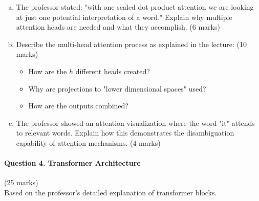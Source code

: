 \documentclass[12pt]{article}
\newcommand{\shortanswer}{\vspace{2cm}}
\newcommand{\mediumanswer}{\vspace{3cm}}
\newcommand{\longanswer}{\vspace{4cm}}
\begin{document}
\begin{enumerate}[(a)]
    \item The professor stated: "with one scaled dot product attention we are looking at just one potential interpretation of a word." Explain why multiple attention heads are needed and what they accomplish. \hfill (6 marks)
    
    \mediumanswer
    
    \item Describe the multi-head attention process as explained in the lecture: \hfill (10 marks)
    \begin{itemize}
        \item How are the $h$ different heads created?
        \item Why are projections to "lower dimensional spaces" used?
        \item How are the outputs combined?
    \end{itemize}
    
    \longanswer
    
    \item The professor showed an attention visualization where the word "it" attends to relevant words. Explain how this demonstrates the disambiguation capability of attention mechanisms. \hfill (4 marks)
    
    \shortanswer
\end{enumerate}

\newpage
\paragraph{Question 4. Transformer Architecture}\hfill (25 marks)\\
Based on the professor's detailed explanation of transformer blocks.
\end{document}
